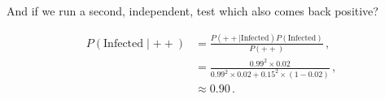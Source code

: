 \noindent And if we run a second, independent, test which also comes back positive?

\begin{equation}\label{eq:stats:BayesEx2}
\begin{split}
P\left(\text{Infected} \mid ++\right) &= \frac{P\left(++ \mid \text{Infected}\right) P\left(\text{Infected}\right)}{P\left(++\right)}\,, \\
&= \frac{\num{0.99}^{2} \times \num{0.02}}{\num{0.99}^{2} \times \num{0.02} + \num{0.15}^{2} \times \left(1-\num{0.02}\right)}\,, \\
&\approx \num{0.90}\,.
\end{split}
\end{equation}









